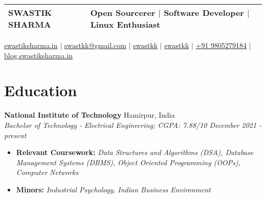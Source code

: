 \documentclass[legalpaper,10.5pt]{article}
\begin{document}
\pagestyle{empty} 


\begin{tabularx}{\linewidth}{@{} l X @{}}
\Huge {SWASTIK SHARMA} & \small{Open Sourcerer $|$ Software Developer $|$ Linux Enthusiast} \\[6pt]
\hline %
\end{tabularx}

\begin{flushleft}
\href{https://www.swastiksharma.in}{\raisebox{-0.05\height}{\faGlobe} swastiksharma.in} $|$ 
\href{mailto:swastkk@gmail.com}{\raisebox{-0.05\height}{\faEnvelope} swastkk@gmail.com} $|$ 
\href{https://github.com/swastkk}{\raisebox{-0.05\height}{\faGithub} swastkk} $|$ 
\href{https://linkedin.com/in/swastkk}{\raisebox{-0.05\height}{\faLinkedin} swastkk} $|$ 
\href{tel:+919805279184}{\raisebox{-0.05\height}{\faMobile} +91 9805279184} $|$ 
\href{https://blog.swastiksharma.in/}{\raisebox{-0.05\height}{\faPen} blog.swastiksharma.in}
\end{flushleft}

\section{Education}

 \textbf{National Institute of Technology}  \hfill {Hamirpur, India}  \\
    \textit{{Bachelor of Technology - Electrical Engineering; CGPA: 7.88/10} \hfill {December 2021 - present}}
    \begin{itemize}[label=$\diamond$]
        \item \small \textbf{Relevant Coursework:} \textit{Data Structures and Algorithms (DSA), Database Management Systems (DBMS), Object Oriented Programming (OOPs),  Computer Networks}
         \item \small \textbf{Minors:} \textit{Industrial Psychology, Indian Business Environment}
    \end{itemize}
\end{document}
